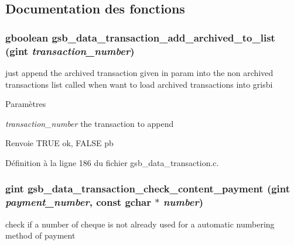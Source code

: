 \subsection{Documentation des fonctions}
\subsubsection[{gsb\_\-data\_\-transaction\_\-add\_\-archived\_\-to\_\-list}]{\setlength{\rightskip}{0pt plus 5cm}gboolean gsb\_\-data\_\-transaction\_\-add\_\-archived\_\-to\_\-list (gint {\em transaction\_\-number})}\label{gsb__data__transaction_8h_a0847630734b4419bc233f313ad6d2766}
just append the archived transaction given in param into the non archived transactions list called when want to load archived transactions into grisbi


\begin{DoxyParams}{Paramètres}
\item[{\em transaction\_\-number}]the transaction to append\end{DoxyParams}
\begin{DoxyReturn}{Renvoie}
TRUE ok, FALSE pb 
\end{DoxyReturn}


Définition à la ligne 186 du fichier gsb\_\-data\_\-transaction.c.

\subsubsection[{gsb\_\-data\_\-transaction\_\-check\_\-content\_\-payment}]{\setlength{\rightskip}{0pt plus 5cm}gint gsb\_\-data\_\-transaction\_\-check\_\-content\_\-payment (gint {\em payment\_\-number}, \/  const gchar $\ast$ {\em number})}\label{gsb__data__transaction_8h_a40575cdeac27ba06abb312fabd076564}
check if a number of cheque is not already used for a automatic numbering method of payment


